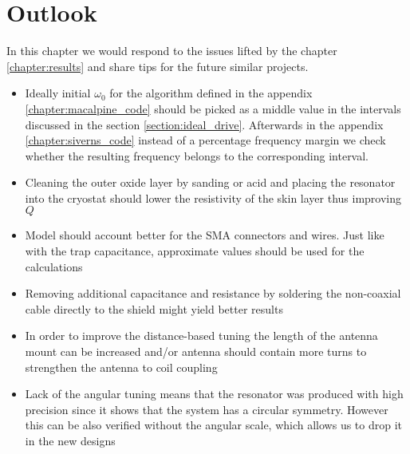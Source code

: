 \chapter{Outlook}

In this chapter we would respond to the issues lifted by the chapter \ref{chapter:results} and share tips for the future similar projects.

\begin{itemize}
	\item Ideally initial $\omega_0$ for the algorithm defined in the appendix \ref{chapter:macalpine_code} should be picked as a middle value in the intervals discussed in the section \ref{section:ideal_drive}. Afterwards in the appendix \ref{chapter:siverns_code} instead of a percentage frequency margin we check whether the resulting frequency belongs to the corresponding interval.
	\item Cleaning the outer oxide layer by sanding or acid and placing the resonator into the cryostat should lower the resistivity of the skin layer thus improving $Q$ \cite{Leupold2015, Fadel2013}
	\item Model should account better for the SMA connectors and wires. Just like with the trap capacitance, approximate values should be used for the calculations
	\item Removing additional capacitance and resistance by soldering the non-coaxial cable directly to the shield might yield better results
	\item In order to improve the distance-based tuning the length of the antenna mount can be increased and/or antenna should contain more turns to strengthen the antenna to coil coupling
	\item Lack of the angular tuning means that the resonator was produced with high precision since it shows that the system has a circular symmetry. However this can be also verified without the angular scale, which allows us to drop it in the new designs
\end{itemize}